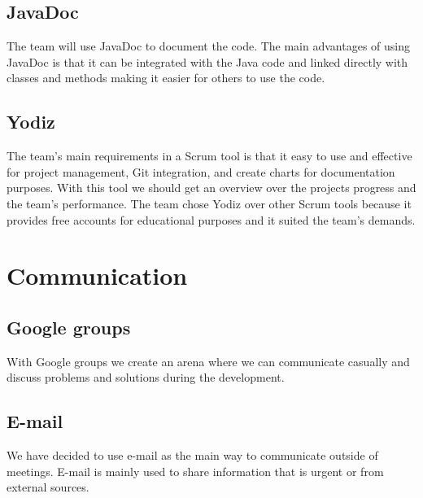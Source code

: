 \subsection{JavaDoc}
The team will use JavaDoc to document the code. The main advantages of using JavaDoc is that it can be integrated with the Java code and linked directly with classes and methods making it easier for others to use the code.

\subsection{Yodiz}
The team's main requirements in a Scrum tool is that it easy to use and effective for project management, Git integration, and create charts for documentation purposes. With this tool we should get an overview over the projects progress and the team's performance. The team chose Yodiz over other Scrum tools because it provides free accounts for educational purposes and it suited the team's demands. 

\section{Communication}
\subsection{Google groups}
With Google groups we create an arena where we can communicate casually and discuss problems and solutions during the development.

\subsection{E-mail}
We have decided to use e-mail as the main way to communicate outside of meetings. E-mail is mainly used to share information that is urgent or from external sources.

